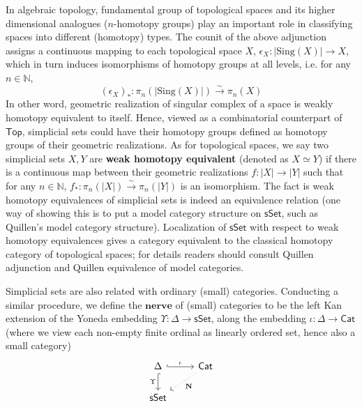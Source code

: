 \documentclass{article}
\theoremstyle{definition}
\theoremstyle{remark}
\begin{document}
In algebraic topology, fundamental group of topological spaces and its higher dimensional analogues ($n$-homotopy groups) play an important role in classifying spaces into different (homotopy) types. The counit of the above adjunction assigns a continuous mapping to each topological space $X$, $\epsilon_X: |\mathrm{Sing}(X)| \to X $, which in turn induces isomorphisms of homotopy groups at all levels, i.e. for any $n \in \mathbb{N}$, $$ (\epsilon_X)_*: \pi_n(|\mathrm{Sing}(X)|) \xrightarrow{\sim} \pi_n(X)$$ In other word, geometric realization of singular complex of a space is weakly homotopy equivalent to itself. Hence, viewed as a combinatorial counterpart of $\mathsf{Top}$, simplicial sets could have their homotopy groups defined as homotopy groups of their geometric realizations. As for topological spaces, we say two simplicial sets $X,Y$ are \textbf{weak homotopy equivalent} (denoted as $X \simeq Y$) if there is a continuous map between their geometric realizations $f: |X| \to |Y|$ such that for any $n \in \mathbb{N}$, $f_*:\pi_n(|X|) \xrightarrow{\sim} \pi_n(|Y|)$ is an isomorphism. The fact is weak homotopy equivalences of simplicial sets is indeed an equivalence relation (one way of showing this is to put a model category structure on $\mathsf{sSet}$, such as Quillen’s model category structure). Localization of $\mathsf{sSet}$ with respect to weak homotopy equivalences gives a category equivalent to the classical homotopy category of topological spaces; for details readers should consult Quillen adjunction and Quillen equivalence of model categories.

Simplicial sets are also related with ordinary (small) categories. Conducting a similar procedure, we define the $\textbf{nerve}$ of (small) categories to be the left Kan extension of the Yoneda embedding $\Upsilon:\Delta \to \mathsf{sSet}$, along the embedding $\iota: \Delta \to \mathsf{Cat}$ (where we view each non-empty finite ordinal as linearly ordered set, hence also a small category) $$ \begin{tikzcd} \Delta \arrow[d, "\Upsilon"', hook] \arrow[r, "\iota", hook] & \mathsf{Cat} \arrow[ld, "\mathbf{N}", dotted] \\ \mathsf{sSet} \end{tikzcd} $$
\end{document}
